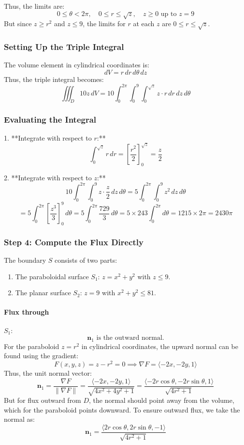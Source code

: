 \documentclass[11pt]{article}
\begin{document}
Thus, the limits are:
\[
0 \leq \theta < 2\pi, \quad 0 \leq r \leq \sqrt{z}, \quad z \geq 0 \text{ up to } z=9
\]
But since \( z \geq r^2 \) and \( z \leq 9 \), the limits for \( r \) at each \( z \) are \( 0 \leq r \leq \sqrt{z} \).

\subsubsection*{Setting Up the Triple Integral}

The volume element in cylindrical coordinates is:
\[
dV = r\, dr\, d\theta\, dz
\]
Thus, the triple integral becomes:
\[
\iiint_{D} 10 z \, dV = 10 \int_{0}^{2\pi} \int_{0}^{9} \int_{0}^{\sqrt{z}} z \cdot r \, dr \, dz \, d\theta
\]

\subsubsection*{Evaluating the Integral}

1. **Integrate with respect to \( r \):**
\[
\int_{0}^{\sqrt{z}} r \, dr = \left[ \frac{r^2}{2} \right]_{0}^{\sqrt{z}} = \frac{z}{2}
\]

2. **Integrate with respect to \( z \):**
\[
10 \int_{0}^{2\pi} \int_{0}^{9} z \cdot \frac{z}{2} \, dz \, d\theta = 5 \int_{0}^{2\pi} \int_{0}^{9} z^2 \, dz \, d\theta
\]
\[
= 5 \int_{0}^{2\pi} \left[ \frac{z^3}{3} \right]_{0}^{9} \, d\theta = 5 \int_{0}^{2\pi} \frac{729}{3} \, d\theta = 5 \times 243 \int_{0}^{2\pi} d\theta = 1215 \times 2\pi = 2430\pi
\]

\subsubsection*{Step 4: Compute the Flux Directly}

The boundary \( S \) consists of two parts:
\begin{enumerate}
    \item The paraboloidal surface \( S_1 \): \( z = x^2 + y^2 \) with \( z \leq 9 \).
    \item The planar surface \( S_2 \): \( z = 9 \) with \( x^2 + y^2 \leq 81 \).
\end{enumerate}

\paragraph{Flux through } $S_1$:
\[
\mathbf{n}_1 \text{ is the outward normal.}
\]
For the paraboloid \( z = r^2 \) in cylindrical coordinates, the upward normal can be found using the gradient:
\[
F(x,y,z) = z - r^2 = 0 \implies \nabla F = \langle -2x, -2y, 1 \rangle
\]
Thus, the unit normal vector:
\[
\mathbf{n}_1 = \frac{\nabla F}{\|\nabla F\|} = \frac{\langle -2x, -2y, 1 \rangle}{\sqrt{4x^2 + 4y^2 +1}} = \frac{\langle -2r\cos\theta, -2r\sin\theta, 1 \rangle}{\sqrt{4r^2 +1}}
\]
But for flux outward from \( D \), the normal should point away from the volume, which for the paraboloid points downward. To ensure outward flux, we take the normal as:
\[
\mathbf{n}_1 = \frac{\langle 2r\cos\theta, 2r\sin\theta, -1 \rangle}{\sqrt{4r^2 +1}}
\]
\end{document}
